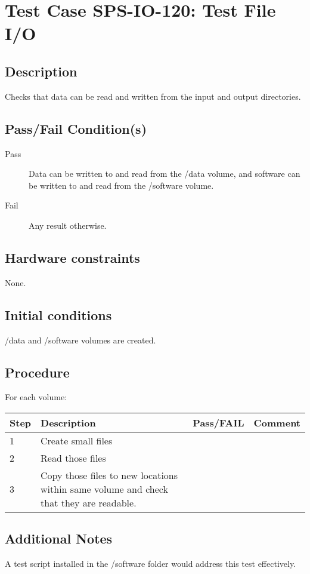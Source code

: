\section{Test Case SPS-IO-120: Test File I/O}

\subsection{Description}

Checks that data can be read and written from the input and output directories.

\subsection{Pass/Fail Condition(s)}

\begin{description}
\item [Pass] Data can be written to and read from the /data volume, 
and software can be written to and read from the /software volume.
\item [Fail] Any result otherwise. 
\end{description}

\subsection{Hardware constraints}

None.

\subsection{Initial conditions}

/data and /software volumes are created.

\subsection{Procedure}

For each volume:

\begin{table}[H]
    \begin{tabular}{|l| p{5cm} |l| p{5cm} |}
    \hline
    {\bf Step} & {\bf Description} & {\bf Pass/FAIL} & {\bf Comment}  \\ \hline
    1 & Create small files &  &  \\ \hline
    2 & Read those files &  &  \\ \hline
    3 & Copy those files to new locations within same volume and check that they are readable. &  &  \\ \hline
    \end{tabular}
\end{table}


\subsection{Additional Notes}

A test script installed in the /software folder would address this test effectively.
